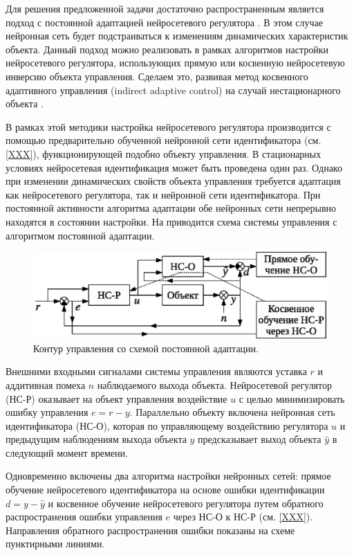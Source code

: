Для решения предложенной задачи достаточно распространенным является
подход с постоянной адаптацией нейросетевого регулятора \cite{XXX}.  В
этом случае нейронная сеть будет подстраиваться к изменениям
динамических характеристик объекта.  Данный подход можно реализовать в
рамках алгоритмов настройки нейросетевого регулятора, использующих
прямую или косвенную нейросетевую инверсию объекта управления.
Сделаем это, развивая метод косвенного адаптивного управления
(indirect adaptive control) на случай нестационарного объекта
\cite{XXX}.

В рамках этой методики настройка нейросетевого регулятора производится
с помощью предварительно обученной нейронной сети идентификатора
(см. \ref{XXX}), функционирующей подобно объекту управления.  В
стационарных условиях нейросетевая идентификация может быть проведена
один раз.  Однако при изменении динамических свойств объекта
управления требуется адаптация как нейросетевого регулятора, так и
нейронной сети идентификатора.  При постоянной активности алгоритма
адаптации обе нейронных сети непрерывно находятся в состоянии
настройки.  На  приводится схема
системы управления с алгоритмом постоянной адаптации.

\begin{figure}[h]
\centering
\includegraphics{permanent_adoption_rus}
\caption{Контур управления со схемой постоянной адаптации.}
\label{fig:permanent_adoption_loop}
\end{figure}

Внешними входными сигналами системы управления являются уставка $r$ и
аддитивная помеха $n$ наблюдаемого выхода объекта.  Нейросетевой
регулятор (НС-Р) оказывает на объект управления воздействие $u$ с
целью минимизировать ошибку управления $e=r-y$.  Параллельно объекту
включена нейронная сеть идентификатора (НС-О), которая по управляющему
воздействию регулятора $u$ и предыдущим наблюдениям выхода объекта $y$
предсказывает выход объекта $\hat{y}$ в следующий момент времени.

Одновременно включены два алгоритма настройки нейронных сетей: прямое
обучение нейросетевого идентификатора на основе ошибки идентификации
$d=y-\hat{y}$ и косвенное обучение нейросетевого регулятора путем
обратного распространения ошибки управления $e$ через НС-О к НС-Р
(см. \ref{XXX}).  Направления обратного распространения ошибки
показаны на схеме пунктирными линиями.

